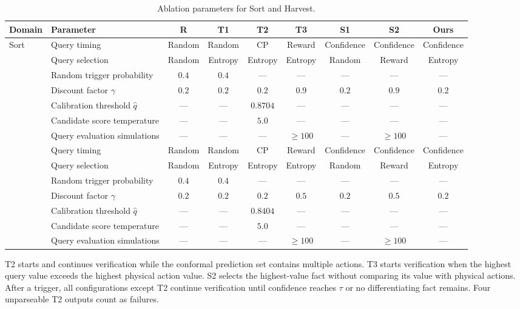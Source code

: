 \begin{table}[!htbp]
\centering
\caption{Ablation parameters for Sort and Harvest.}
\label{tab:app_ablation_params}
\footnotesize
\setlength{\tabcolsep}{2pt}
\renewcommand{\arraystretch}{1.05}
\setlength{\extrarowheight}{0pt}
\begin{tabular*}{\textwidth}{@{\extracolsep{\fill}}llccccccc@{}}
\toprule
Domain & Parameter & R & T1 & T2 & T3 & S1 & S2 & \textbf{Ours} \\
\midrule
\multirow{7}{*}{Sort} & Query timing & Random & Random & CP & Reward & Confidence & Confidence & Confidence \\
 & Query selection & Random & Entropy & Entropy & Entropy & Random & Reward & Entropy \\
 & Random trigger probability & $0.4$ & $0.4$ & --- & --- & --- & --- & --- \\
 & Discount factor $\gamma$ & $0.2$ & $0.2$ & $0.2$ & $0.9$ & $0.2$ & $0.9$ & $0.2$ \\
 & Calibration threshold $\hat{q}$ & --- & --- & $0.8704$ & --- & --- & --- & --- \\
 & Candidate score temperature & --- & --- & $5.0$ & --- & --- & --- & --- \\
 & Query evaluation simulations & --- & --- & --- & $\geq 100$ & --- & $\geq 100$ & --- \\
\addlinespace[3pt]
\multirow{7}{*}{Harvest} & Query timing & Random & Random & CP & Reward & Confidence & Confidence & Confidence \\
 & Query selection & Random & Entropy & Entropy & Entropy & Random & Reward & Entropy \\
 & Random trigger probability & $0.4$ & $0.4$ & --- & --- & --- & --- & --- \\
 & Discount factor $\gamma$ & $0.2$ & $0.2$ & $0.2$ & $0.5$ & $0.2$ & $0.5$ & $0.2$ \\
 & Calibration threshold $\hat{q}$ & --- & --- & $0.8404$ & --- & --- & --- & --- \\
 & Candidate score temperature & --- & --- & $5.0$ & --- & --- & --- & --- \\
 & Query evaluation simulations & --- & --- & --- & $\geq 100$ & --- & $\geq 100$ & --- \\
\bottomrule
\end{tabular*}
\end{table}

T2 starts and continues verification while the conformal prediction set contains multiple actions. T3 starts verification when the highest query value exceeds the highest physical action value. S2 selects the highest-value fact without comparing its value with physical actions. After a trigger, all configurations except T2 continue verification until confidence reaches $\tau$ or no differentiating fact remains. Four unparseable T2 outputs count as failures.

